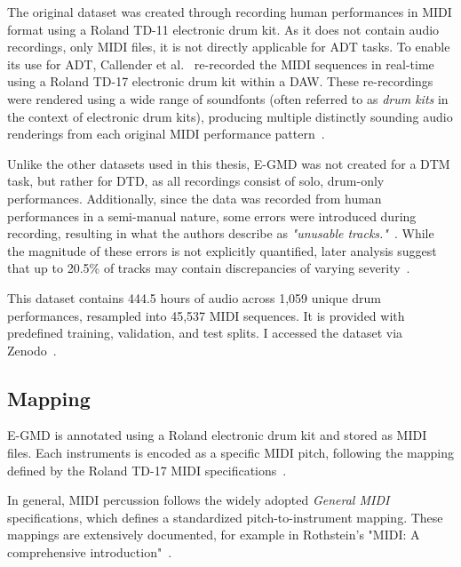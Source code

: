 The original dataset was created through recording human performances in MIDI format using a Roland TD-11 electronic drum kit. As it does not contain audio recordings, only MIDI files, it is not directly applicable for \gls{ADT} tasks. To enable its use for \gls{ADT}, Callender et al.~\cite{callender2020improvingperceptualqualitydrum} re-recorded the MIDI sequences in real-time using a Roland TD-17 electronic drum kit within a \gls{DAW}. These re-recordings were rendered using a wide range of soundfonts (often referred to as \textit{drum kits} in the context of electronic drum kits), producing multiple distinctly sounding audio renderings from each original MIDI performance pattern~\cite{pmlr-v97-gillick19a, callender2020improvingperceptualqualitydrum}.

Unlike the other datasets used in this thesis, E-GMD was not created for a \gls{DTM} task, but rather for \gls{DTD}, as all recordings consist of solo, drum-only performances. Additionally, since the data was recorded from human performances in a semi-manual nature, some errors were introduced during recording, resulting in what the authors describe as \textit{"unusable tracks."}~\cite{callender2020improvingperceptualqualitydrum}. While the magnitude of these errors is not explicitly quantified, later analysis suggest that up to 20.5\% of tracks may contain discrepancies of varying severity~\cite{holz2021automatic}.

This dataset contains 444.5 hours of audio across 1,059 unique drum performances, resampled into 45,537 MIDI sequences. It is provided with predefined training, validation, and test splits. I accessed the dataset via Zenodo~\cite{callender_2020_4300943, callender2020improvingperceptualqualitydrum}.

\subsection{Mapping}

E-GMD is annotated using a Roland electronic drum kit and stored as MIDI files. Each instruments is encoded as a specific MIDI pitch, following the mapping defined by the Roland TD-17 MIDI specifications~\cite{pmlr-v97-gillick19a, callender2020improvingperceptualqualitydrum, roland_drum_midi_td_17}.

In general, MIDI percussion follows the widely adopted \textit{General MIDI} specifications, which defines a standardized pitch-to-instrument mapping. These mappings are extensively documented, for example in Rothstein's "MIDI: A comprehensive introduction"~\cite{rothstein1995midi}.

